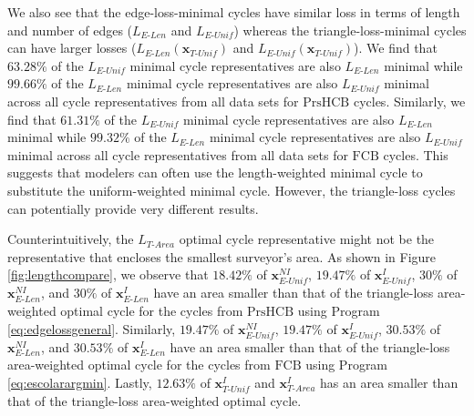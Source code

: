 \documentclass[11pt,onecolumn]{article}
\newcommand{\optimalrep}{\mathbf{x}}
\newcommand{\fig}{Figure }
\newcommand{\NI}{^{NI}}
\newcommand{\I}{^I}
\newcommand{\setoffilteredcyclebases}{\mathrm{FCB}}
\newcommand{\setofpersistenthcyclebases}{\mathrm{PrsHCB}}
\newcommand{\EU}{_{E\text{-}Unif}}
\newcommand{\EL}{_{E\text{-}Len}}
\newcommand{\TU}{_{T\text{-}Unif}}
\newcommand{\TA}{_{T\text{-}Area}}
\theoremstyle{plain}
\theoremstyle{definition}
\begin{document}
We also see that the edge-loss-minimal cycles have similar loss in terms of length and number of edges ($L\EL$ and $L\EU$) whereas the triangle-loss-minimal cycles can have larger losses ($L\EL(\optimalrep\TU)$ and $L\EU(\optimalrep\TU)$). We find that $63.28\%$ of the $L\EU$ minimal cycle representatives are also $L\EL$ minimal while $99.66\%$ of the $L\EL$ minimal cycle representatives are also $L\EU$ minimal across all cycle representatives from all data sets for $\setofpersistenthcyclebases$ cycles. Similarly, we find that $61.31\%$ of the $L\EU$ minimal cycle representatives are also $L\EL$ minimal while $99.32\%$ of the $L\EL$ minimal cycle representatives are also $L\EU$ minimal across all cycle representatives from all data sets for $\setoffilteredcyclebases$ cycles. This suggests that modelers can often use the length-weighted minimal cycle to substitute the uniform-weighted minimal cycle. However, the triangle-loss cycles can potentially provide very different results. 


Counterintuitively, the $L\TA$ optimal cycle representative might not be the representative that encloses the smallest surveyor's area. As shown in \fig\ref{fig:lengthcompare}, we observe that $18.42\%$ of $\optimalrep\EU\NI$, $19.47\%$ of $\optimalrep\EU\I$, $30\%$ of $\optimalrep\EL\NI$, and $30\%$ of  $\optimalrep\EL\I$ have an area smaller than that of the triangle-loss area-weighted optimal cycle for the cycles from $\setofpersistenthcyclebases$ using Program \eqref{eq:edgelossgeneral}. 
Similarly,  $19.47\%$ of $\optimalrep\EU\NI$, $19.47\%$ of  $\optimalrep\EU\I$, $30.53\%$ of $\optimalrep\EL\NI$, and $30.53\%$ of $\optimalrep\EL\I$ have an area smaller than that of the triangle-loss area-weighted optimal cycle for the cycles from $\setoffilteredcyclebases$ using Program \eqref{eq:escolarargmin}. Lastly, $12.63\%$ of $\optimalrep^{I}\TU$ and $\optimalrep^{I}\TA$ has an area smaller than that of the triangle-loss area-weighted optimal cycle.  
\end{document}
